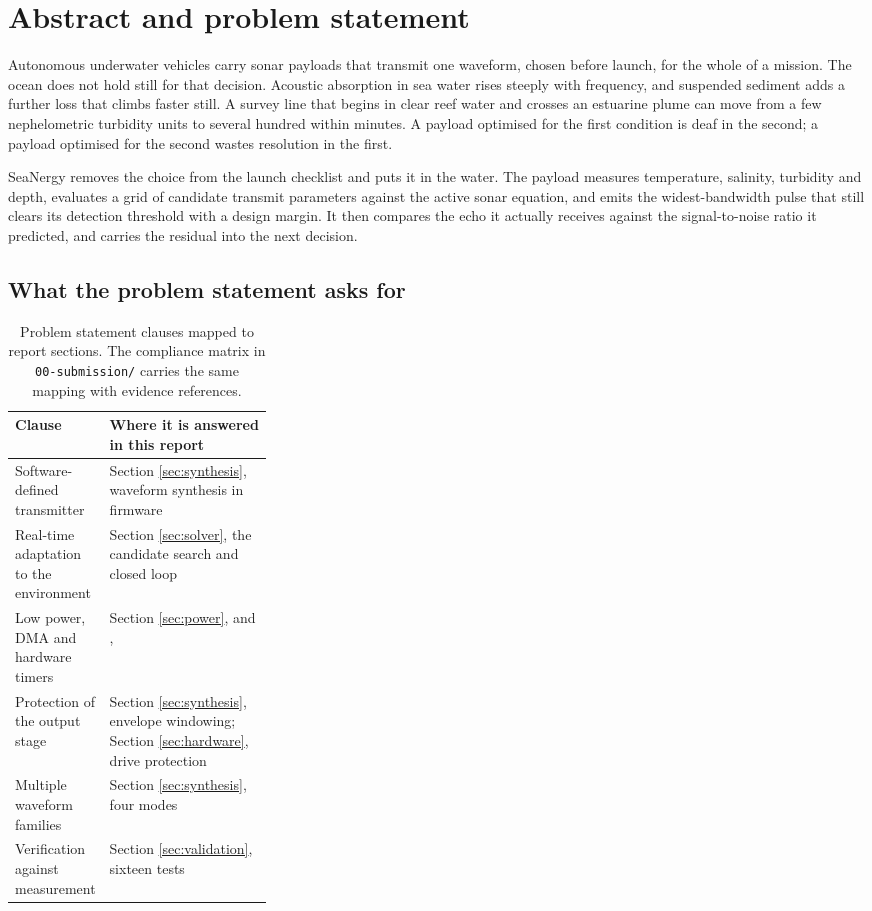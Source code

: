 \documentclass[11pt,a4paper]{article}
\begin{document}
\tableofcontents
\newpage

\section{Abstract and problem statement}

Autonomous underwater vehicles carry sonar payloads that transmit one waveform,
chosen before launch, for the whole of a mission. The ocean does not hold still
for that decision. Acoustic absorption in sea water rises steeply with
frequency, and suspended sediment adds a further loss that climbs faster still.
A survey line that begins in clear reef water and crosses an estuarine plume can
move from a few nephelometric turbidity units to several hundred within
minutes. A payload optimised for the first condition is deaf in the second; a
payload optimised for the second wastes resolution in the first.

SeaNergy removes the choice from the launch checklist and puts it in the water.
The payload measures temperature, salinity, turbidity and depth, evaluates a
grid of candidate transmit parameters against the active sonar equation, and
emits the widest-bandwidth pulse that still clears its detection threshold with
a design margin. It then compares the echo it actually receives against the
signal-to-noise ratio it predicted, and carries the residual into the next
decision.

\subsection{What the problem statement asks for}

\begin{table}[htbp]
\centering
\small
\begin{tabularx}{\linewidth}{L{0.30\linewidth}Y}
\toprule
\textbf{Clause} & \textbf{Where it is answered in this report} \\
\midrule
Software-defined transmitter & Section \ref{sec:synthesis}, waveform synthesis in firmware \\
Real-time adaptation to the environment & Section \ref{sec:solver}, the candidate search and closed loop \\
Low power, DMA and hardware timers & Section \ref{sec:power}, and ,  \\
Protection of the output stage & Section \ref{sec:synthesis}, envelope windowing; Section \ref{sec:hardware}, drive protection \\
Multiple waveform families & Section \ref{sec:synthesis}, four modes \\
Verification against measurement & Section \ref{sec:validation}, sixteen tests \\
\bottomrule
\end{tabularx}
\caption{Problem statement clauses mapped to report sections. The compliance
matrix in \texttt{00-submission/} carries the same mapping with evidence
references.}
\end{table}
\end{document}
